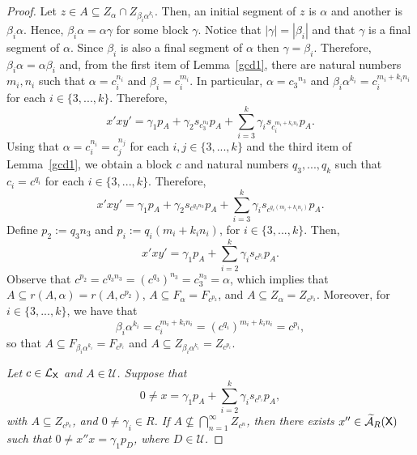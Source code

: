\documentclass[a4paper,12pt]{amsart}
\theoremstyle{definition}
\theoremstyle{remark}
\numberwithin{equation}{section}
\newcommand{\osf}{{\normalfont \textsf{X}}}
\newcommand{\lang}{\CL_{\osf}}
\newcommand{\ualgshift}{\TCA_R(\osf)}
\newcommand{\CA}{\mathcal{A}}
\newcommand{\CL}{\mathcal{L}}
\newcommand{\TCA}{\widetilde{\CA}}
\newcommand{\TCB}{\mathcal{U}}
\begin{document}
\begin{proof}
Let $z\in A\subseteq Z_\alpha\cap Z_{\beta_i\alpha^{k_i}}$. Then, an initial segment of $z$ is $\alpha$ and another is $\beta_i \alpha$. Hence, $\beta_i \alpha=\alpha \gamma$ for some block $\gamma$. Notice that $|\gamma|=|\beta_i|$ and that $\gamma$ is a final segment of $\alpha$. Since $\beta_i$ is also a final segment of $\alpha$ then $\gamma=\beta_i$. Therefore, $\beta_i \alpha=\alpha\beta_i$ and, from the first item of Lemma~\ref{gcd1}, there are natural numbers $m_i,n_i$ such that $\alpha=c_i^{n_i}$ and $\beta_i=c_i^{m_i}$.
In particular, $\alpha={c_3}^{n_3}$ and  $\beta_i\alpha^{k_i}=c_i^{m_i+k_in_i}$ for each $i\in \{3,...,k\}$. Therefore, 
$$x'xy'=\gamma_1 p_A +\gamma_2 s_{c_3^{n_3}} p_A +\sum\limits_{i=3}^k \gamma_i s_{c_i^{m_i+k_in_i}}p_A.$$
Using that $\alpha=c_i^{n_i}=c_j^{n_j}$ for each $i,j\in \{3,...,k\}$ and the third item of Lemma~\ref{gcd1}, we obtain a block $c$ and natural numbers $q_3,...,q_k$ 
such that $c_i=c^{q_i}$ for each $i\in \{3,...,k\}$. Therefore, 
$$x'xy'=\gamma_1 p_A +\gamma_2 s_{c^{q_3n_3}} p_A +\sum\limits_{i=3}^k \gamma_i s_{c^{q_i(m_i+k_in_i)}}p_A.$$  Define $p_2:=q_3n_3$ and $p_i:=q_i(m_i+k_in_i)$, for $i\in \{3,...,k\}$. Then, 
$$x'xy'=\gamma_1 p_A +\sum\limits_{i=2}^k \gamma_i s_{c^{p_i}}p_A.$$
Observe that $c^{p_2}=c^{q_3n_3}=(c^{q_3})^{n_3}=c_3^{n_3}=\alpha$, which implies that $A\subseteq r(A,\alpha)=r(A,c^{p_2})$, $A\subseteq F_{\alpha}=F_{c^{p_2}}$, and $A\subseteq Z_{\alpha}=Z_{c^{p_2}}$. Moreover, for $i\in \{3,...,k\}$, we have that $$\beta_i\alpha^{k_i}=c_i^{m_i+k_in_i}=(c^{q_i})^{m_i+k_in_i}=c^{p_i},$$ so that $A\subseteq F_{\beta_i\alpha^{k_i}}=F_{c^{p_i}}$ and $A\subseteq Z_{\beta_i\alpha^{k_i}}=Z_{c^{p_i}}$.




\smallskip
{}
{\it Let $c\in \lang$ and $A\in \TCB$. Suppose that $$0\neq x =\gamma_1p_A+\sum\limits_{i=2}^k\gamma_i s_{c^{p_i}}p_A,$$ with $A\subseteq Z_{c^{p_k}}$, and $0\neq \gamma_i\in R$. If $A\nsubseteq \bigcap \limits_{n=1}^\infty Z_{c^n}$, then there exists $x''\in \ualgshift$ such that $0\neq x''x=\gamma_1 p_D$, where $D\in \TCB$.}
\smallskip


\end{proof}
\end{document}
